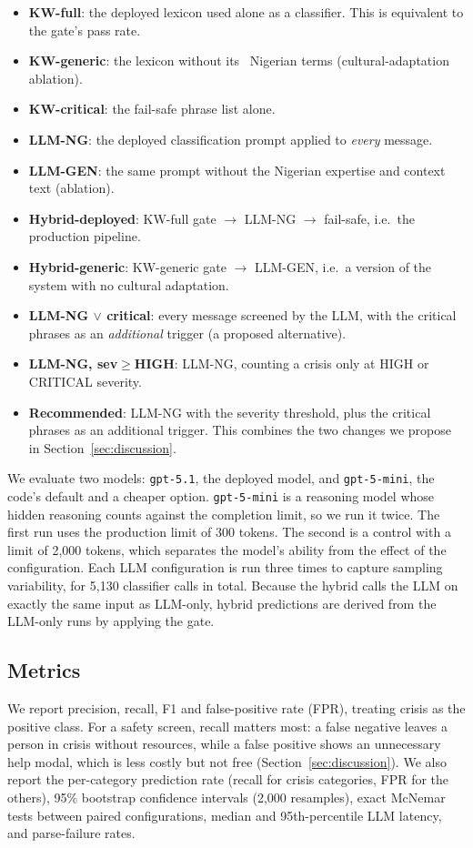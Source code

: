 \begin{itemize}
  \item \textbf{KW-full}: the deployed lexicon used alone as a classifier. This is equivalent to the gate's pass rate.
  \item \textbf{KW-generic}: the lexicon without its \Nlexng\ Nigerian terms (cultural-adaptation ablation).
  \item \textbf{KW-critical}: the fail-safe phrase list alone.
  \item \textbf{LLM-NG}: the deployed classification prompt applied to \emph{every} message.
  \item \textbf{LLM-GEN}: the same prompt without the Nigerian expertise and context text (ablation).
  \item \textbf{Hybrid-deployed}: KW-full gate $\rightarrow$ LLM-NG $\rightarrow$ fail-safe, i.e.\ the production pipeline.
  \item \textbf{Hybrid-generic}: KW-generic gate $\rightarrow$ LLM-GEN, i.e.\ a version of the system with no cultural adaptation.
  \item \textbf{LLM-NG $\lor$ critical}: every message screened by the LLM, with the critical phrases as an \emph{additional} trigger (a proposed alternative).
  \item \textbf{LLM-NG, sev$\geq$HIGH}: LLM-NG, counting a crisis only at HIGH or CRITICAL severity.
  \item \textbf{Recommended}: LLM-NG with the severity threshold, plus the critical phrases as an additional trigger. This combines the two changes we propose in Section~\ref{sec:discussion}.
\end{itemize}

We evaluate two models: \texttt{gpt-5.1}, the deployed model, and \texttt{gpt-5-mini}, the code's default and a cheaper option. \texttt{gpt-5-mini} is a reasoning model whose hidden reasoning counts against the completion limit, so we run it twice. The first run uses the production limit of 300 tokens. The second is a control with a limit of 2{,}000 tokens, which separates the model's ability from the effect of the configuration. Each LLM configuration is run three times to capture sampling variability, for 5{,}130 classifier calls in total. Because the hybrid calls the LLM on exactly the same input as LLM-only, hybrid predictions are derived from the LLM-only runs by applying the gate.

\subsection{Metrics}
We report precision, recall, F1 and false-positive rate (FPR), treating crisis as the positive class. For a safety screen, recall matters most: a false negative leaves a person in crisis without resources, while a false positive shows an unnecessary help modal, which is less costly but not free (Section~\ref{sec:discussion}). We also report the per-category prediction rate (recall for crisis categories, FPR for the others), 95\% bootstrap confidence intervals (2{,}000 resamples), exact McNemar tests between paired configurations, median and 95th-percentile LLM latency, and parse-failure rates.

